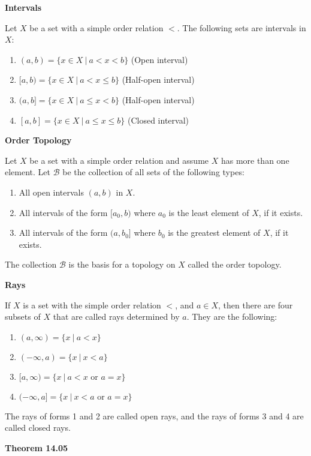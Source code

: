 \documentclass{article}
\newcommand{\B}{\mathcal B}
\begin{document}
\medskip\noindent\textbf{Intervals}

    Let $X$ be a set with a simple order relation $<$. The following sets are intervals in $X$:
    \begin{enumerate}
        \item $(a,b) = \{x \in X ~|~ a < x < b\}$ (Open interval)
        \item $[a,b) = \{x \in X ~|~ a < x \leq b\}$ (Half-open interval)
        \item $(a,b] = \{x \in X ~|~ a \leq x < b\}$ (Half-open interval)
        \item $[a,b] = \{x \in X ~|~ a \leq x \leq b\}$ (Closed interval)
    \end{enumerate}

\medskip\noindent\textbf{Order Topology}

    Let $X$ be a set with a simple order relation and assume $X$ has more than one element. Let $\B$ be the collection of all sets of the following types:
    \begin{enumerate}
        \item All open intervals $(a,b)$ in $X$.
        \item All intervals of the form $[a_0,b)$ where $a_0$ is the least element of $X$, if it exists.
        \item All intervals of the form $(a,b_0]$ where $b_0$ is the greatest element of $X$, if it exists.
    \end{enumerate}

    The collection $\B$ is the basis for a topology on $X$ called the order topology.

\medskip\noindent\textbf{Rays}

    If $X$ is a set with the simple order relation $<$, and $a \in X$, then there are four subsets of $X$ that are called rays determined by $a$. They are the following:
    \begin{enumerate}
        \item $(a, \infty) = \{x ~|~ a < x\}$
        \item $(-\infty, a) = \{x ~|~ x < a\}$
        \item $[a, \infty) = \{x ~|~ a < x \text{ or } a = x\}$
        \item $(-\infty, a] = \{x ~|~ x < a \text{ or } a = x\}$
    \end{enumerate}
    The rays of forms 1 and 2 are called open rays, and the rays of forms 3 and 4 are called closed rays.

\medskip\noindent\textbf{Theorem 14.05}
\end{document}
